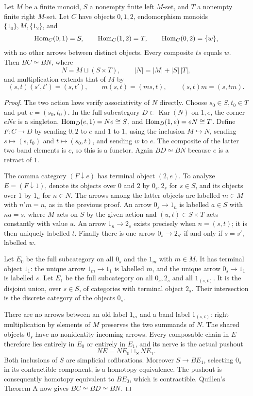 \begin{theorem}
\label{C:triangle-band-compression}
Let $M$ be a finite monoid, $S$ a nonempty finite left $M$-set,
and $T$ a nonempty finite right $M$-set.  Let $C$ have objects
$0,1,2$, endomorphism monoids $\{1_0\},M,\{1_2\}$, and
\[
 \operatorname{Hom}_C(0,1)=S,\qquad \operatorname{Hom}_C(1,2)=T,\qquad
 \operatorname{Hom}_C(0,2)=\{w\},
\]
with no other arrows between distinct objects.  Every composite
$t s$ equals $w$.  Then $BC\simeq BN$, where
\[
 N=M\sqcup(S\times T),\qquad |N|=|M|+|S|\,|T|,
\]
and multiplication extends that of $M$ by
\[
 (s,t)(s',t')=(s,t'),\qquad
 m(s,t)=(ms,t),\qquad (s,t)m=(s,tm).
\]
\end{theorem}
\begin{proof}
The two action laws verify associativity of $N$ directly.
Choose $s_0\in S,t_0\in T$ and put $e=(s_0,t_0)$.
In the full subcategory $D\subset\operatorname{Kar}(N)$ on
$1,e$, the corner $eNe$ is a singleton,
$\operatorname{Hom}_D(e,1)=Ne\cong S$, and $\operatorname{Hom}_D(1,e)=eN\cong T$.
Define $F:C\to D$ by sending $0,2$ to $e$ and $1$ to $1$,
using the inclusion $M\hookrightarrow N$, sending
$s\mapsto(s,t_0)$ and $t\mapsto(s_0,t)$, and sending $w$ to $e$.
The composite of the latter two band elements is $e$, so this
is a functor.  Again $BD\simeq BN$ because $e$ is a retract of $1$.

The comma category $(F\downarrow e)$ has terminal object
$(2,e)$.  To analyze $E=(F\downarrow1)$, denote its objects
over $0$ and $2$ by $0_s,2_s$ for $s\in S$, and its objects
over $1$ by $1_n$ for $n\in N$.  The arrows among the latter
objects are labelled $m\in M$ with $n'm=n$, as in the previous
proof.  An arrow $0_s\to1_n$ is labelled $a\in S$ with
$n a=s$, where $M$ acts on $S$ by the given action and
$(u,t)\in S\times T$ acts constantly with value $u$.
An arrow $1_n\to2_s$ exists precisely when $n=(s,t)$;
it is then uniquely labelled $t$.  Finally there is one arrow
$0_s\to2_{s'}$ if and only if $s=s'$, labelled $w$.

Let $E_0$ be the full subcategory on all $0_s$ and the
$1_m$ with $m\in M$.  It has terminal object $1_1$:
the unique arrow $1_m\to1_1$ is labelled $m$, and the unique
arrow $0_s\to1_1$ is labelled $s$.
Let $E_1$ be the full subcategory on all $0_s,2_s$ and all
$1_{(s,t)}$.  It is the disjoint union, over $s\in S$, of
categories with terminal object $2_s$.
Their intersection is the discrete category of the objects $0_s$.

There are no arrows between an old label $1_m$ and a band label
$1_{(s,t)}$: right multiplication by elements of $M$ preserves
the two summands of $N$.  The shared objects $0_s$ have no
nonidentity incoming arrows.  Every composable chain in $E$
therefore lies entirely in $E_0$ or entirely in $E_1$, and its
nerve is the actual pushout
\[
 NE=NE_0\sqcup_S NE_1.
\]
Both inclusions of $S$ are simplicial cofibrations.  Moreover
$S\to BE_1$, selecting $0_s$ in its contractible component, is
a homotopy equivalence.  The pushout is consequently homotopy
equivalent to $BE_0$, which is contractible.  Quillen's Theorem A
now gives $BC\simeq BD\simeq BN$.
\end{proof}

